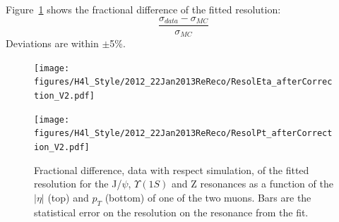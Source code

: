 Figure~\ref{fig:ResolDATAMC_8TeV} shows the fractional difference of the fitted resolution: 
\[
\frac{\sigma_{data}-\sigma_{MC}}{\sigma_{MC}}
\]
Deviations are within $\pm$5\%.

\begin{figure}[hbtp]  
\begin{center}
\texttt{[image: figures/H4l\_Style/2012\_22Jan2013ReReco/ResolEta\_afterCorrection\_V2.pdf]}
\end{center}
\begin{center}
\texttt{[image: figures/H4l\_Style/2012\_22Jan2013ReReco/ResolPt\_afterCorrection\_V2.pdf]} 
\end{center}
 \hspace{1cm} 
   \caption{Fractional difference, data with respect simulation, of the fitted resolution for the J/$\psi$,
     $\Upsilon(1S)$ and Z resonances as a function of the $|\eta|$ (top)
     and $p_T$ (bottom) of one of the two muons. Bars are the
     statistical error on the resolution on the resonance from the fit.
   \label{fig:ResolDATAMC_8TeV}}
\end{figure} 


